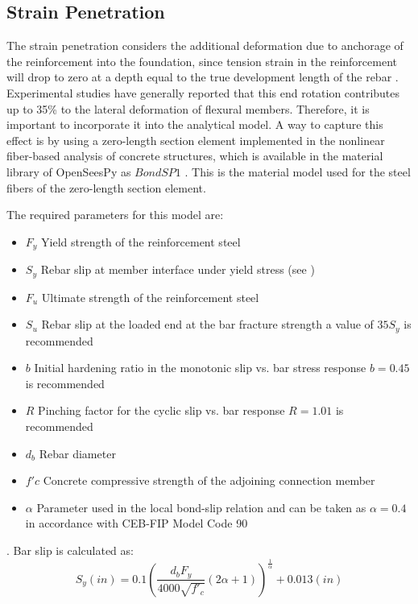 \subsection{Strain Penetration}

The strain penetration considers the additional deformation due to anchorage of the reinforcement into the foundation, since tension strain in the reinforcement will drop to zero at a depth equal to the true development length of the rebar \cite{Priestley2007}. Experimental studies have generally reported that this end rotation contributes up to 35\% to the lateral deformation of flexural members\cite{Zhao2007}. Therefore, it is important to incorporate it into the analytical model. A way to capture this effect is by using a zero-length section element implemented in the nonlinear fiber-based analysis of concrete structures, which is available in the material library of OpenSeesPy as $Bond SP1$ \cite{Zhao2007}. This is the material model used for the steel fibers of the zero-length section element.

The required parameters for this model are:
\begin{itemize}
	\item $F_{y}$ Yield strength of the reinforcement steel
	\item $S_{y}$ Rebar slip at member interface under yield stress (see )
	\item $F_{u}$ Ultimate strength of the reinforcement steel
	\item $S_{u}$ Rebar slip at the loaded end at the bar fracture strength a value of $35 S_{y}$ is recommended \cite{Zhao2007}
	\item $b$ Initial hardening ratio in the monotonic slip vs. bar stress response $b=0.45$ is recommended \cite{Zhao2007}
	\item $R$ Pinching factor for the cyclic slip vs. bar response $R=1.01$ is recommended \cite{Zhao2007}
	\item $d_b$ Rebar diameter
	\item $f'c$ Concrete compressive strength of the adjoining connection member
	\item $\alpha$ Parameter used in the local bond-slip relation and can be taken as $\alpha=0.4$ in accordance with CEB-FIP Model Code 90 \cite{CEB1993}
\end{itemize}.
\newline
Bar slip is calculated as:
\begin{equation}
	S_{y}(in)=0.1\left(\frac{d_{b}F_{y}}{4000\sqrt{f'_{c}}}\left(2\alpha+1\right)\right)^{\frac{1}{\alpha}}+0.013 (in)
	\label{eq.Rebar_Slip}
\end{equation}
